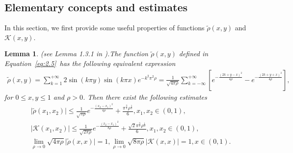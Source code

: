 \documentclass[11pt]{article}
\numberwithin{equation}{section}%
\numberwithin{figure}{section}%
\newtheorem{lemma}[theorem]{Lemma}
\theoremstyle{remark}
\begin{document}
	\subsection{Elementary concepts and estimates}\label{sec:2.2}
	In this section, we first provide some useful properties of functions $\tilde{\rho}(x,y)$ and $\mathcal{K}(x,y)$.
	\begin{lemma}(see Lemma 1.3.1 in \cite{Dalang2024book}).\label{lem:equiva}
		The function $\tilde{\rho}(x,y)$ defined in Equation~\eqref{eq:2.5}~has the following equivalent expression
		\begin{align}\label{eq:kerneleq}
			\tilde{\rho}(x,y)=\sum_{k=1}^{+\infty}2\sin(k\pi y)\sin(k\pi x)e^{-k^{2}\pi^{2}\rho}=\frac{1}{\sqrt{4\pi\rho}}\sum_{k=-\infty}^{+\infty}\left[e^{-\frac{(2k+y-x)^{2}}{4\rho}}-e^{-\frac{(2k+y+x)^{2}}{4\rho}}\right],
		\end{align}
		for $0\leq x,y\leq 1$ and $\rho>0$. Then there exist the following estimates
		\begin{equation}\label{eq:color}
			\begin{split}
				&\vert\tilde{\rho}(x_{1},x_{2})\vert \leq \frac{1}{\sqrt{\pi\rho}}e^{-\frac{(x_{2}-x_{1})^{2}}{4\rho}}+\frac{\pi^{\frac{3}{2}}\rho^{\frac{1}{2}}}{6},x_{1},x_{2}\in(0,1),\\
				&\vert\mathcal{K}(x_{1},x_{2}) \vert\leq
				\frac{1}{\sqrt{2\pi\rho}}e^{-\frac{(x_{2}-x_{1})^{2}}{8\rho}}+\frac{\sqrt{2}\pi^{\frac{3}{2}}\rho^{\frac{1}{2}}}{6},x_{1},x_{2}\in(0,1),\\
			&\lim_{\rho\rightarrow 0}\sqrt{4\pi\rho}\vert\tilde{\rho}(x,x)\vert=1, \lim_{\rho\rightarrow 0}\sqrt{8\pi\rho} \vert\mathcal{K}(x,x) \vert=1,x\in(0,1).
		\end{split}
\end{equation}
	\end{lemma}
\end{document}
